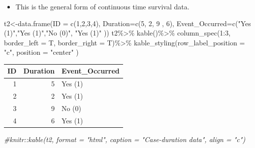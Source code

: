 \documentclass[
]{article}
\newenvironment{Shaded}{\begin{snugshade}}{\end{snugshade}}
\newcommand{\AttributeTok}[1]{\textcolor[rgb]{0.77,0.63,0.00}{#1}}
\newcommand{\CommentTok}[1]{\textcolor[rgb]{0.56,0.35,0.01}{\textit{#1}}}
\newcommand{\DecValTok}[1]{\textcolor[rgb]{0.00,0.00,0.81}{#1}}
\newcommand{\FunctionTok}[1]{\textcolor[rgb]{0.00,0.00,0.00}{#1}}
\newcommand{\NormalTok}[1]{#1}
\newcommand{\OtherTok}[1]{\textcolor[rgb]{0.56,0.35,0.01}{#1}}
\newcommand{\SpecialCharTok}[1]{\textcolor[rgb]{0.00,0.00,0.00}{#1}}
\newcommand{\StringTok}[1]{\textcolor[rgb]{0.31,0.60,0.02}{#1}}
\providecommand{\tightlist}{%
  \setlength{\itemsep}{0pt}\setlength{\parskip}{0pt}}
\begin{document}
\begin{itemize}
\tightlist
\item
  This is the general form of continuous time survival data.
\end{itemize}

\begin{Shaded}
\begin{Highlighting}[]
\NormalTok{t2}\OtherTok{\textless{}{-}}\FunctionTok{data.frame}\NormalTok{(}\AttributeTok{ID =} \FunctionTok{c}\NormalTok{(}\DecValTok{1}\NormalTok{,}\DecValTok{2}\NormalTok{,}\DecValTok{3}\NormalTok{,}\DecValTok{4}\NormalTok{),}
               \AttributeTok{Duration=}\FunctionTok{c}\NormalTok{(}\DecValTok{5}\NormalTok{, }\DecValTok{2}\NormalTok{, }\DecValTok{9}\NormalTok{ , }\DecValTok{6}\NormalTok{), }
               \AttributeTok{Event\_Occurred=}\FunctionTok{c}\NormalTok{(}\StringTok{"Yes (1)"}\NormalTok{,}\StringTok{"Yes (1)"}\NormalTok{,}\StringTok{"No (0)"}\NormalTok{, }\StringTok{"Yes (1)"}\NormalTok{ ))}
\NormalTok{t2}\SpecialCharTok{\%\textgreater{}\%}
  \FunctionTok{kable}\NormalTok{()}\SpecialCharTok{\%\textgreater{}\%}
  \FunctionTok{column\_spec}\NormalTok{(}\DecValTok{1}\SpecialCharTok{:}\DecValTok{3}\NormalTok{, }\AttributeTok{border\_left =}\NormalTok{ T, }\AttributeTok{border\_right =}\NormalTok{ T)}\SpecialCharTok{\%\textgreater{}\%}
  \FunctionTok{kable\_styling}\NormalTok{(}\AttributeTok{row\_label\_position =} \StringTok{"c"}\NormalTok{, }\AttributeTok{position =} \StringTok{"center"}\NormalTok{ )}
\end{Highlighting}
\end{Shaded}

\begin{table}
\centering
\begin{tabular}{|>{}r|||>{}r|||>{}l|}
\hline
ID & Duration & Event\_Occurred\\
\hline
1 & 5 & Yes (1)\\
\hline
2 & 2 & Yes (1)\\
\hline
3 & 9 & No (0)\\
\hline
4 & 6 & Yes (1)\\
\hline
\end{tabular}
\end{table}

\begin{Shaded}
\begin{Highlighting}[]
\CommentTok{\#knitr::kable(t2, format = "html", caption = "Case{-}duration data", align = "c")}
\end{Highlighting}
\end{Shaded}
\end{document}
